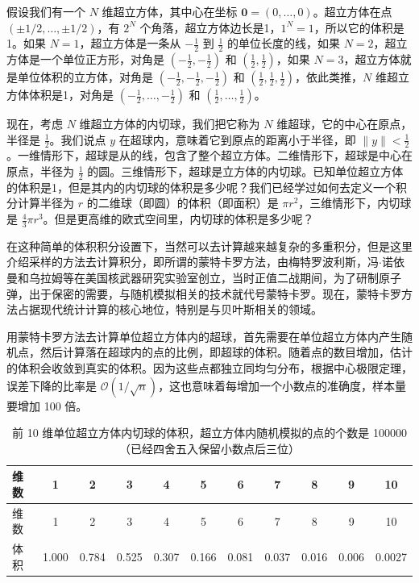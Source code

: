 \documentclass[12pt,a4paper,UTF8,twoside]{book}
\theoremstyle{definition}
\theoremstyle{definition}
\theoremstyle{definition}
\theoremstyle{remark}
\begin{document}
假设我们有一个 \(N\) 维超立方体，其中心在坐标
\(\mathbf{0} = (0,\ldots,0)\)。超立方体在点
\((\pm 1/2,\ldots,\pm 1/2)\)，有 \(2^{N}\)
个角落，超立方体边长是1，\(1^{N}=1\)，所以它的体积是1。如果
\(N=1\)，超立方体是一条从 \(-\frac{1}{2}\) 到 \(\frac{1}{2}\)
的单位长度的线，如果 \(N=2\)，超立方体是一个单位正方形，对角是
\(\left( -\frac{1}{2}, -\frac{1}{2} \right)\) 和
\(\left( \frac{1}{2}, \frac{1}{2} \right)\)，如果
\(N=3\)，超立方体就是单位体积的立方体，对角是
\(\left( -\frac{1}{2}, -\frac{1}{2}, -\frac{1}{2} \right)\) 和
\(\left( \frac{1}{2}, \frac{1}{2}, \frac{1}{2} \right)\)，依此类推，\(N\)
维超立方体体积是1，对角是
\(\left( -\frac{1}{2}, \ldots, -\frac{1}{2} \right)\) 和
\(\left( \frac{1}{2}, \ldots, \frac{1}{2} \right)\)。

现在，考虑 \(N\) 维超立方体的内切球，我们把它称为 \(N\)
维超球，它的中心在原点，半径是 \(\frac{1}{2}\)。我们说点 \(y\)
在超球内，意味着它到原点的距离小于半径，即
\(\| y \| < \frac{1}{2}\)。一维情形下，超球是从的线，包含了整个超立方体。二维情形下，超球是中心在原点，半径为
\(\frac{1}{2}\)
的圆。三维情形下，超球是立方体的内切球。已知单位超立方体的体积是1，但是其内的内切球的体积是多少呢？我们已经学过如何去定义一个积分计算半径为
\(r\) 的二维球（即圆）的体积（即面积）是
\(\pi r^2\)，三维情形下，内切球是
\(\frac{4}{3}\pi r^3\)。但是更高维的欧式空间里，内切球的体积是多少呢？

在这种简单的体积积分设置下，当然可以去计算越来越复杂的多重积分，但是这里介绍采样的方法去计算积分，即所谓的蒙特卡罗方法，由梅特罗波利斯，冯\(\cdot\)诺依曼和乌拉姆等在美国核武器研究实验室创立，当时正值二战期间，为了研制原子弹，出于保密的需要，与随机模拟相关的技术就代号蒙特卡罗。现在，蒙特卡罗方法占据现代统计计算的核心地位，特别是与贝叶斯相关的领域。

用蒙特卡罗方法去计算单位超立方体内的超球，首先需要在单位超立方体内产生随机点，然后计算落在超球内的点的比例，即超球的体积。随着点的数目增加，估计的体积会收敛到真实的体积。因为这些点都独立同均匀分布，根据中心极限定理，误差下降的比率是
\(\mathcal{O}\left( 1 / \sqrt{n} \right)\)，这也意味着每增加一个小数点的准确度，样本量要增加
100 倍。

\begin{longtable}[]{@{}lcccccccccc@{}}
\caption{\label{tab:calculate-volume-of-hyperball} 前 10
维单位超立方体内切球的体积，超立方体内随机模拟的点的个数是
100000（已经四舍五入保留小数点后三位）}\tabularnewline
\toprule
维数 & 1 & 2 & 3 & 4 & 5 & 6 & 7 & 8 & 9 & 10\tabularnewline
\midrule
\endfirsthead
\toprule
维数 & 1 & 2 & 3 & 4 & 5 & 6 & 7 & 8 & 9 & 10\tabularnewline
\midrule
\endhead
体积 & 1.000 & 0.784 & 0.525 & 0.307 & 0.166 & 0.081 & 0.037 & 0.016 &
0.006 & 0.0027\tabularnewline
\bottomrule
\end{longtable}
\end{document}
